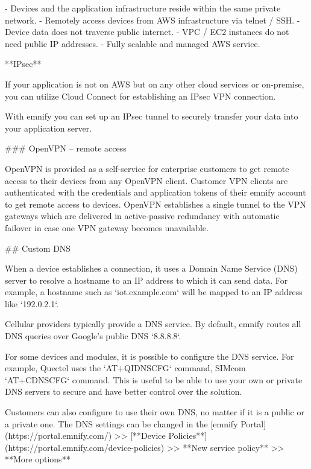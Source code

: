 \documentclass[11pt, oneside]{article}   	%
\newcommand{\addspace}{\vspace{2mm}}
\begin{document}
\addspace
\begin{markdown}
- Devices and the application infrastructure reside within the same private network.
- Remotely access devices from AWS infrastructure via telnet / SSH.
- Device data does not traverse public internet.
- VPC / EC2 instances do not need public IP addresses.
- Fully scalable and managed AWS service.
\end{markdown}
\addspace
\begin{markdown}

**IPsec**

If your application is not on AWS but on any other cloud services or on-premise, you can utilize Cloud Connect for establishing an IPsec VPN connection.

With emnify you can set up an IPsec tunnel to securely transfer your data into your application server.

### OpenVPN -- remote access

OpenVPN is provided as a self-service for enterprise customers to get remote access to their devices from any OpenVPN client.
Customer VPN clients are authenticated with the credentials and application tokens of their emnify account to get remote access to devices.
OpenVPN establishes a single tunnel to the VPN gateways which are delivered in active-passive redundancy with automatic failover in case one VPN gateway becomes unavailable.

## Custom DNS

When a device establishes a connection, it uses a Domain Name Service (DNS) server to resolve a hostname to an IP address to which it can send data.
For example, a hostname such as `iot.example.com` will be mapped to an IP address like `192.0.2.1`.

Cellular providers typically provide a DNS service.
By default, emnify routes all DNS queries over Google's public DNS `8.8.8.8`.

For some devices and modules, it is possible to configure the DNS service.
For example, Quectel uses the `AT+QIDNSCFG` command, SIMcom `AT+CDNSCFG` command.
This is useful to be able to use your own or private DNS servers to secure and have better control over the solution.

Customers can also configure to use their own DNS, no matter if it is a public or a private one.
The DNS settings can be changed in the [emnify Portal](https://portal.emnify.com/) >> [**Device Policies**](https://portal.emnify.com/device-policies) >>  **New service policy** >>  **More options**


\end{markdown}
\end{document}
